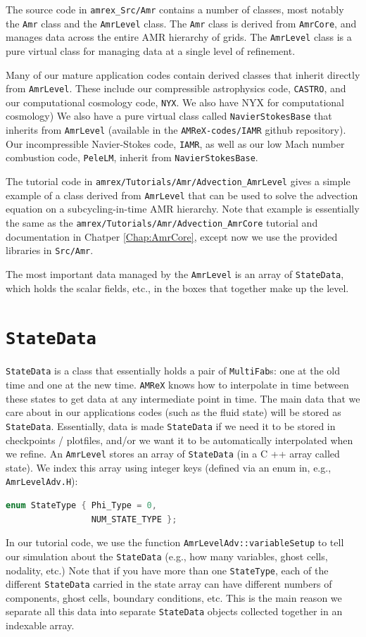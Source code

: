 The source code in {\tt amrex\_Src/Amr} contains a number of classes, most notably
the {\tt Amr} class and the {\tt AmrLevel} class.
The {\tt Amr} class is derived from {\tt AmrCore}, and manages data across the 
entire AMR hierarchy of grids.
The {\tt AmrLevel} class is a pure virtual class for managing data at a
single level of refinement.

Many of our mature application codes contain derived classes that inherit directly
from {\tt AmrLevel}.  These include our compressible astrophysics code,
{\tt CASTRO}, and our computational cosmology code, {\tt NYX}.  We also have
NYX for computational cosmology)   We also have 
a pure virtual class called {\tt NavierStokesBase} that inherits from {\tt AmrLevel}
(available in the {\tt AMReX-codes/IAMR} github repository).  Our incompressible
Navier-Stokes code, {\tt IAMR}, as well as our low Mach number combustion code,
{\tt PeleLM}, inherit from {\tt NavierStokesBase}.

The tutorial code in {\tt amrex/Tutorials/Amr/Advection\_AmrLevel} gives a simple
example of a class derived from {\tt AmrLevel} that can be used to solve
the advection equation on a subcycling-in-time AMR hierarchy.  Note that example
is essentially the same as the {\tt amrex/Tutorials/Amr/Advection\_AmrCore} tutorial
and documentation in Chatper \ref{Chap:AmrCore}, except now we use the provided
libraries in {\tt Src/Amr}.

The most important data managed by the {\tt AmrLevel} is an array of {\tt StateData},
which holds the scalar fields, etc., in the boxes that together make up the level.

\section{{\tt StateData}}
{\tt StateData} is a class that essentially holds a pair of {\tt MultiFab}s: one at the old time and one
at the new time. {\tt AMReX} knows how to interpolate in time between these states to get data at
any intermediate point in time. The main data that we care about in our applications codes 
(such as the fluid state) will be stored as {\tt StateData}. Essentially, data is made {\tt StateData}
if we need it to be stored in checkpoints / plotfiles, and/or we want it to be automatically
interpolated when we refine.
An {\tt AmrLevel} stores an array of {\tt StateData} (in a C ++ array called state). We index this array
using integer keys (defined via an enum in, e.g., {\tt AmrLevelAdv.H}):
\begin{lstlisting}[language=cpp]
enum StateType { Phi_Type = 0,
                 NUM_STATE_TYPE };
\end{lstlisting}
In our tutorial code, we use the function {\tt AmrLevelAdv::variableSetup} to tell our simulation about
the {\tt StateData} (e.g., how many variables, ghost cells, nodality, etc.)
Note that if you have more than one {\tt StateType}, each of the different {\tt StateData} 
carried in the state array can have different numbers
of components, ghost cells, boundary conditions, etc. This is the main reason we separate all this
data into separate {\tt StateData} objects collected together in an indexable array.

